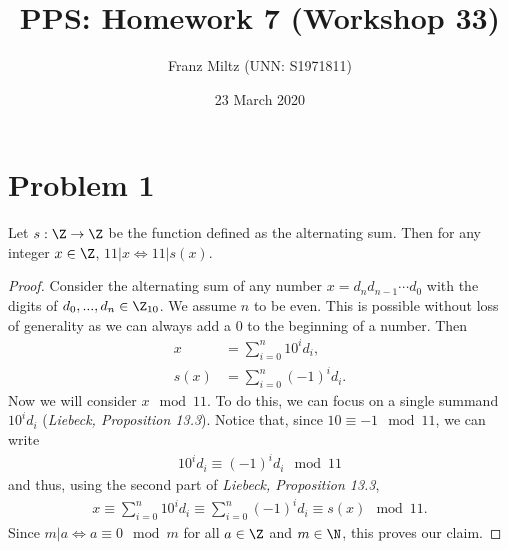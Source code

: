 \documentclass{article}
\title{PPS: Homework 7 (Workshop 33)}
\author{Franz Miltz (UNN: S1971811)}
\date{23 March 2020}
\begin{document}
\maketitle
\section*{Problem 1}
\begin{claim}
  Let $s:\Z \to \Z$ be the function defined as the alternating sum. Then for any integer $x\in\Z$, $11|x \Leftrightarrow 11|s(x)$.
\end{claim}
\begin{proof}
  Consider the alternating sum of any number $x=d_nd_{n-1}\cdots d_0$ with the digits of $d_0,...,d_n\in\Z_{10}$.
  We assume $n$ to be even. This is possible without loss of generality as we can always add a $0$ to the beginning of a number.
  Then
  \begin{align*}
    x &= \sum_{i=0}^n 10^id_i,\\
    s(x) &= \sum_{i=0}^n (-1)^id_i.
  \end{align*}
  Now we will consider $x\mod 11$. To do this, we can focus on a single summand $10^id_i$ (\emph{Liebeck, Proposition 13.3}). 
  Notice that, since $10\equiv -1 \mod 11$, we can write
  \begin{align*}
    10^id_i \equiv (-1)^id_i \mod 11
  \end{align*}
  and thus, using the second part of \emph{Liebeck, Proposition 13.3},
  \begin{align*}
  x \equiv \sum_{i=0}^n 10^id_i \equiv \sum_{i=0}^n (-1)^id_i\equiv s(x)\mod 11.
  \end{align*}
  Since $m|a\Leftrightarrow a\equiv 0 \mod m$ for all $a\in\Z$ and $m\in\N$, this proves our claim.
\end{proof}
\end{document}
